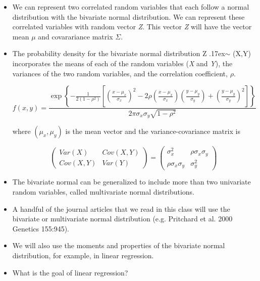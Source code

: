 \documentclass[12pt]{report}
\begin{document}
\begin{itemize}

\item We can represent two correlated random variables that each follow a normal distribution with the bivariate normal distribution. We can represent these correlated variables with random vector \textit{Z}. This vector \textit{Z} will have the vector mean $\mu$ and covarariance matrix $\Sigma$.

\item The probability density for the bivariate normal distribution Z {\raise.17ex\hbox{$\scriptstyle\sim$}} \big(X,Y\big) incorporates the means of each of the random variables (\textit{X} and \textit{Y}), the variances of the two random variables, and the correlation coefficient, $\rho$.

\[
f(x,y)=\frac{\exp \left\{ -\frac 1{2(1-\rho ^2)}\left[ \left( \frac{x-\mu _x%
}{\sigma _x}\right) ^2-2\rho \left( \frac{x-\mu _x}{\sigma _x}\right) \left( 
\frac{y-\mu _y}{\sigma _y}\right) +\left( \frac{y-\mu _y}{\sigma _y}\right)
^2\right] \right\} }{2\pi \sigma _x\sigma _y\sqrt{1-\rho ^2}} 
\]

where $(\mu _x,\mu _y)$ is the mean vector and the variance-covariance
matrix is

\[
\left( 
\begin{array}{cc}
Var(X) & Cov(X,Y) \\ 
Cov(X,Y) & Var(Y)
\end{array}
\right) =\left( 
\begin{array}{cc}
\sigma _x^2 & \rho \sigma _x\sigma _y \\ 
\rho \sigma _x\sigma _y & \sigma _y^2
\end{array}
\right) 
\]

\bigskip
\item The bivariate normal can be generalized to include more than two univariate random variables, called multivariate normal distributions. 

\item A handful of the journal articles that we read in this class will use the bivariate or multivariate normal distribution (e.g. Pritchard et al. 2000 Genetics 155:945). 

\item We will also use the moments and properties of the bivariate normal distribution, for example, in linear regression. 

\item What is the goal of linear regression? 


\end{itemize}
\end{document}
